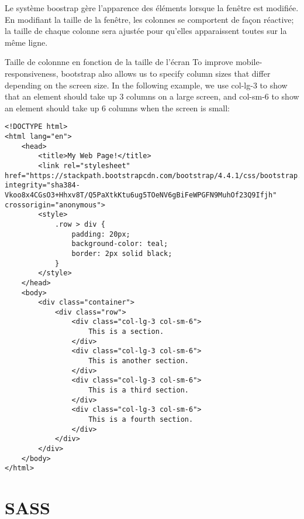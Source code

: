 \documentclass{report}
\begin{document}
\begin{note}
Le système boostrap gère l'apparence des éléments lorsque la fenêtre est modifiée. 	
En modifiant la taille de la fenêtre, les colonnes se comportent de façon réactive; la taille de chaque colonne
sera ajustée pour qu'elles apparaissent toutes sur la même ligne.
\end{note}
\begin{Remarque*}{Taille de colonnne en fonction de la taille de l'écran}{}
To improve mobile-responsiveness, bootstrap also allows us to specify column sizes that differ depending on the screen size. In the following example, we use col-lg-3 to show that an element should take up 3 columns on a large screen, and col-sm-6 to show an element should take up 6 columns when the screen is small:
\end{Remarque*}

\begin{ExampleDdHTML*}{}{}
\begin{lstlisting}[style=HTMLDraculaDark]
	<!DOCTYPE html>
<html lang="en">
    <head>
        <title>My Web Page!</title>
        <link rel="stylesheet" href="https://stackpath.bootstrapcdn.com/bootstrap/4.4.1/css/bootstrap.min.css" integrity="sha384-Vkoo8x4CGsO3+Hhxv8T/Q5PaXtkKtu6ug5TOeNV6gBiFeWPGFN9MuhOf23Q9Ifjh" crossorigin="anonymous">
        <style>
            .row > div {
                padding: 20px;
                background-color: teal;
                border: 2px solid black;
            }
        </style>
    </head>
    <body>
        <div class="container">
            <div class="row">
                <div class="col-lg-3 col-sm-6">
                    This is a section.
                </div>
                <div class="col-lg-3 col-sm-6">
                    This is another section.
                </div>
                <div class="col-lg-3 col-sm-6">
                    This is a third section.
                </div>
                <div class="col-lg-3 col-sm-6">
                    This is a fourth section.
                </div>
            </div>
        </div>
    </body>
</html>
\end{lstlisting}
\end{ExampleDdHTML*}

% 


\chapter{SASS}
\end{document}
